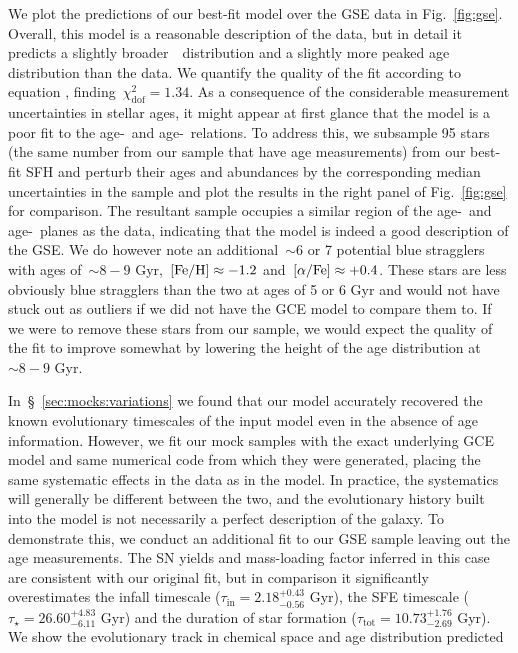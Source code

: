 \documentclass[ms.tex]{subfiles}
\begin{document}
We plot the predictions of our best-fit model over the GSE data in
Fig.~\ref{fig:gse}.
Overall, this model is a reasonable description of the data, but in detail it
predicts a slightly broader~\feh~distribution and a slightly more peaked
age distribution than the data.
We quantify the quality of the fit according to equation
, finding~$\chi_\text{dof}^2 = 1.34$.
As a consequence of the considerable measurement uncertainties in stellar ages,
it might appear at first glance that the model is a poor fit to the
age-\feh~and age-\afe~relations.
To address this, we subsample 95 stars (the same number from our sample that
have age measurements) from our best-fit SFH and perturb their ages and
abundances by the corresponding median uncertainties in the sample and plot the
results in the right panel of Fig.~\ref{fig:gse} for comparison.
The resultant sample occupies a similar region of the age-\feh~and
age-\afe~planes as the data, indicating that the model is indeed a good
description of the GSE.
We do however note an additional~$\sim$6 or 7 potential blue stragglers with
ages of~$\sim8 - 9$ Gyr,~$\text{[Fe/H]} \approx -1.2$ and~$\text{[$\alpha$/Fe]} \approx +0.4$.
These stars are less obviously blue stragglers than the two at ages of 5 or 6
Gyr and would not have stuck out as outliers if we did not have the GCE model
to compare them to.
If we were to remove these stars from our sample, we would expect the quality
of the fit to improve somewhat by lowering the height of the age distribution
at~$\sim8 - 9$ Gyr.
\par
In~\S~\ref{sec:mocks:variations} we found that our model accurately recovered
the known evolutionary timescales of the input model even in the absence of
age information.
However, we fit our mock samples with the exact underlying GCE model and same
numerical code from which they were generated, placing the same systematic
effects in the data as in the model.
In practice, the systematics will generally be different between the two, and
the evolutionary history built into the model is not necessarily a perfect
description of the galaxy.
To demonstrate this, we conduct an additional fit to our GSE sample leaving
out the age measurements.
The SN yields and mass-loading factor inferred in this case are consistent
with our original fit, but in comparison it significantly overestimates the
infall timescale ($\tau_\text{in} = 2.18^{+0.43}_{-0.56}$ Gyr), the SFE
timescale ($\tau_\star = 26.60^{+4.83}_{-6.11}$ Gyr) and the duration of star
formation ($\tau_\text{tot} = 10.73^{+1.76}_{-2.69}$ Gyr).
We show the evolutionary track in chemical space and age distribution predicted
\end{document}
